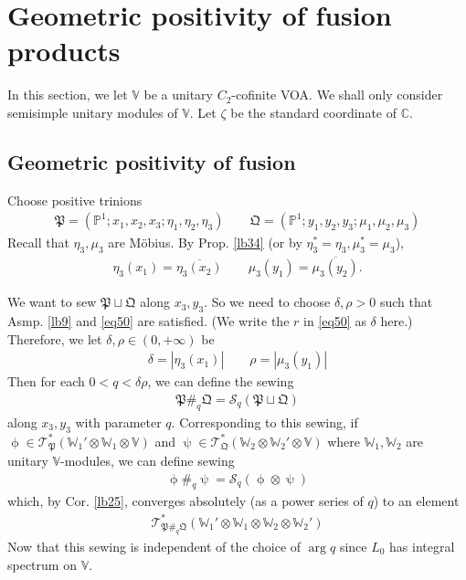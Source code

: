 \documentclass[11pt,b5paper,notitlepage]{article}
\theoremstyle{definition}
\theoremstyle{plain}
\newcommand{\fk}{\mathfrak}
\newcommand{\mc}{\mathcal}
\newcommand{\ovl}{\overline}
\newcommand{\scr}{\mathscr}
\newcommand{\Vbb}{\mathbb V}
\newcommand{\Wbb}{\mathbb W}
\newcommand{\Cbb}{\mathbb C}
\newcommand{\Pbb}{\mathbb P}
\numberwithin{equation}{section}
\begin{document}
\section{Geometric positivity of fusion products}


In this section, we let $\Vbb$ be a unitary $C_2$-cofinite VOA. We shall only consider semisimple unitary modules of $\Vbb$. Let $\zeta$ be the standard coordinate of $\Cbb$.


\subsection{Geometric positivity of fusion}\label{lb49}

Choose positive trinions
\begin{align*}
\fk P=(\Pbb^1;x_1,x_2,x_3;\eta_1,\eta_2,\eta_3)\qquad \fk Q=(\Pbb^1;y_1,y_2,y_3;\mu_1,\mu_2,\mu_3)
\end{align*}
Recall that $\eta_3,\mu_3$ are M\"obius. By Prop. \ref{lb34} (or by $\eta_3^*=\eta_3,\mu_3^*=\mu_3$),
\begin{align*}
\eta_3(x_1)=\ovl{\eta_3(x_2)}\qquad \mu_3(y_1)=\ovl{\mu_3(y_2)}.
\end{align*}

We want to sew $\fk P\sqcup\fk Q$ along $x_3,y_3$. So we need to choose $\delta,\rho>0$ such that Asmp. \ref{lb9} and \eqref{eq50} are satisfied. (We write the $r$ in \eqref{eq50} as $\delta$ here.) Therefore, we let $\delta,\rho\in(0,+\infty)$ be
\begin{align*}
\delta=|\eta_3(x_1)|\qquad \rho=|\mu_3(y_1)|
\end{align*}
Then for each $0<q<\delta\rho$, we can define the sewing
\begin{align*}
\fk P\#_q\fk Q=\mc S_q(\fk P\sqcup\fk Q)
\end{align*}
along $x_3,y_3$ with parameter $q$. Corresponding to this sewing, if $\upphi\in\scr T_{\fk P}^*(\Wbb_1'\otimes\Wbb_1\otimes\Vbb)$ and $\uppsi\in \scr T_{\fk Q}^*(\Wbb_2\otimes\Wbb_2'\otimes\Vbb)$ where $\Wbb_1,\Wbb_2$ are unitary $\Vbb$-modules, we can define sewing
\begin{align*}
\upphi\#_q\uppsi=\mc S_q(\upphi\otimes\uppsi)
\end{align*}
which, by Cor. \ref{lb25}, converges absolutely (as a power series of $q$) to an element 
\begin{align*}
\scr T_{\fk P\#_q\fk Q}^*(\Wbb_1'\otimes\Wbb_1\otimes\Wbb_2\otimes\Wbb_2')
\end{align*}
Now that this sewing is independent of the choice of $\arg q$ since $L_0$ has integral spectrum on $\Vbb$.
\end{document}
